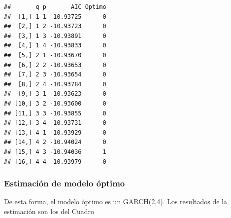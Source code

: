 \documentclass[
]{book}
\begin{document}
\begin{verbatim}
##       q p       AIC Optimo
##  [1,] 1 1 -10.93725      0
##  [2,] 1 2 -10.93723      0
##  [3,] 1 3 -10.93891      0
##  [4,] 1 4 -10.93833      0
##  [5,] 2 1 -10.93670      0
##  [6,] 2 2 -10.93653      0
##  [7,] 2 3 -10.93654      0
##  [8,] 2 4 -10.93784      0
##  [9,] 3 1 -10.93623      0
## [10,] 3 2 -10.93600      0
## [11,] 3 3 -10.93855      0
## [12,] 3 4 -10.93731      0
## [13,] 4 1 -10.93929      0
## [14,] 4 2 -10.94024      0
## [15,] 4 3 -10.94036      1
## [16,] 4 4 -10.93979      0
\end{verbatim}

\hypertarget{estimaciuxf3n-de-modelo-uxf3ptimo}{%
\subsubsection{Estimación de modelo óptimo}\label{estimaciuxf3n-de-modelo-uxf3ptimo}}

De esta forma, el modelo óptimo es un GARCH(2,4). Los resultados de la estimación son los del Cuadro
\end{document}
